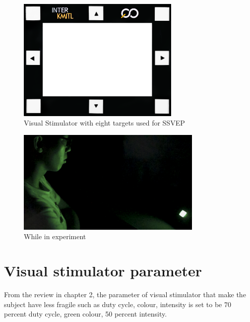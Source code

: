 \begin{figure}[ht]
	\centering
	\includegraphics[width=0.7\textwidth]{chapter7/frame_8.jpg}
	\caption{Visual Stimulator with eight targets used for SSVEP}
\end{figure}
\begin{figure}[ht]
	\centering
	\includegraphics[width=0.8\textwidth]{chapter6/experi.jpg}
	\caption{While in experiment}
\end{figure}
\section{Visual stimulator parameter}
\hspace{1.5cm}From the review in chapter 2, the parameter of visual stimulator that make the subject have less fragile such as duty cycle, colour, intensity is set to be 70 percent duty cycle, green colour, 50 percent intensity. 